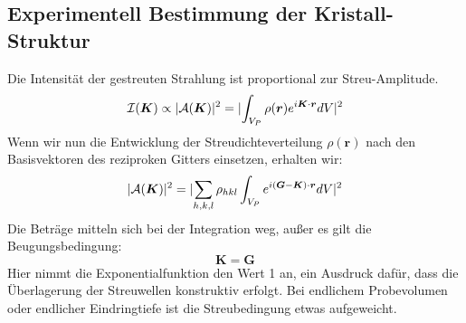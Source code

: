 \documentclass[11pt]{article}
\DeclarePairedDelimiter\abs{\lvert}{\rvert}
\begin{document}
\subsection{Experimentell Bestimmung der Kristall-Struktur}
Die Intensität der gestreuten Strahlung ist proportional zur Streu-Amplitude.
\begin{equation}
  \mathcal{I}(\bm{K}) \propto \abs{\mathcal{A}(\bm{K})}^2=
  \abs{\int_{V_P}\rho(\bm{r})e^{i\bm{K}\cdot\bm{r}}dV}^2
\end{equation}
Wenn wir nun die Entwicklung der Streudichteverteilung $\rho(\bm{r})$ nach den
Basisvektoren des reziproken Gitters einsetzen, erhalten wir:
\begin{equation}
  \abs{\mathcal{A}(\bm{K})}^2=\abs{\sum_{h,k,l}\rho_{hkl}\int_{V_P}
  e^{i(\bm{G}-\bm{K})\cdot\bm{r}}dV}^2
\end{equation}
Die Beträge mitteln sich bei der Integration weg, außer es gilt die
Beugungsbedingung:
\begin{equation} \label{ref1}
  \bm{K}=\bm{G}
\end{equation}
Hier nimmt die Exponentialfunktion den Wert 1 an, ein Ausdruck dafür, dass die
Überlagerung der Streuwellen konstruktiv erfolgt. Bei endlichem Probevolumen
oder endlicher Eindringtiefe ist die Streubedingung etwas aufgeweicht.
\end{document}
